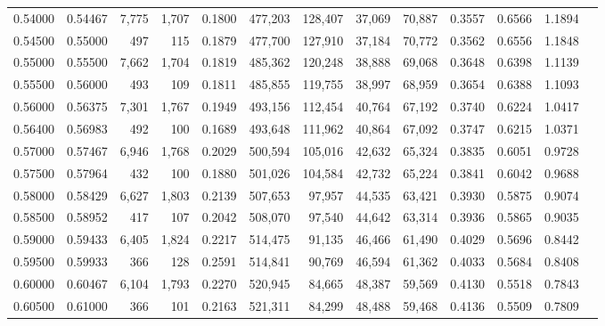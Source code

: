 \begin{tabular}{rrrrrrrrrrrrr}
0.54000 & 0.54467 &  7,775 & 1,707 &                                     0.1800 & 477,203 & 128,407 &  37,069 &  70,887 & 0.3557 & 0.6566 & 1.1894 \\
0.54500 & 0.55000 &    497 &   115 &                                     0.1879 & 477,700 & 127,910 &  37,184 &  70,772 & 0.3562 & 0.6556 & 1.1848 \\
0.55000 & 0.55500 &  7,662 & 1,704 &                                     0.1819 & 485,362 & 120,248 &  38,888 &  69,068 & 0.3648 & 0.6398 & 1.1139 \\
0.55500 & 0.56000 &    493 &   109 &                                     0.1811 & 485,855 & 119,755 &  38,997 &  68,959 & 0.3654 & 0.6388 & 1.1093 \\
0.56000 & 0.56375 &  7,301 & 1,767 &                                     0.1949 & 493,156 & 112,454 &  40,764 &  67,192 & 0.3740 & 0.6224 & 1.0417 \\
0.56400 & 0.56983 &    492 &   100 &                                     0.1689 & 493,648 & 111,962 &  40,864 &  67,092 & 0.3747 & 0.6215 & 1.0371 \\
0.57000 & 0.57467 &  6,946 & 1,768 &                                     0.2029 & 500,594 & 105,016 &  42,632 &  65,324 & 0.3835 & 0.6051 & 0.9728 \\
0.57500 & 0.57964 &    432 &   100 &                                     0.1880 & 501,026 & 104,584 &  42,732 &  65,224 & 0.3841 & 0.6042 & 0.9688 \\
0.58000 & 0.58429 &  6,627 & 1,803 &                                     0.2139 & 507,653 &  97,957 &  44,535 &  63,421 & 0.3930 & 0.5875 & 0.9074 \\
0.58500 & 0.58952 &    417 &   107 &                                     0.2042 & 508,070 &  97,540 &  44,642 &  63,314 & 0.3936 & 0.5865 & 0.9035 \\
0.59000 & 0.59433 &  6,405 & 1,824 &                                     0.2217 & 514,475 &  91,135 &  46,466 &  61,490 & 0.4029 & 0.5696 & 0.8442 \\
0.59500 & 0.59933 &    366 &   128 &                                     0.2591 & 514,841 &  90,769 &  46,594 &  61,362 & 0.4033 & 0.5684 & 0.8408 \\
0.60000 & 0.60467 &  6,104 & 1,793 &                                     0.2270 & 520,945 &  84,665 &  48,387 &  59,569 & 0.4130 & 0.5518 & 0.7843 \\
0.60500 & 0.61000 &    366 &   101 &                                     0.2163 & 521,311 &  84,299 &  48,488 &  59,468 & 0.4136 & 0.5509 & 0.7809 \\

\end{tabular}
